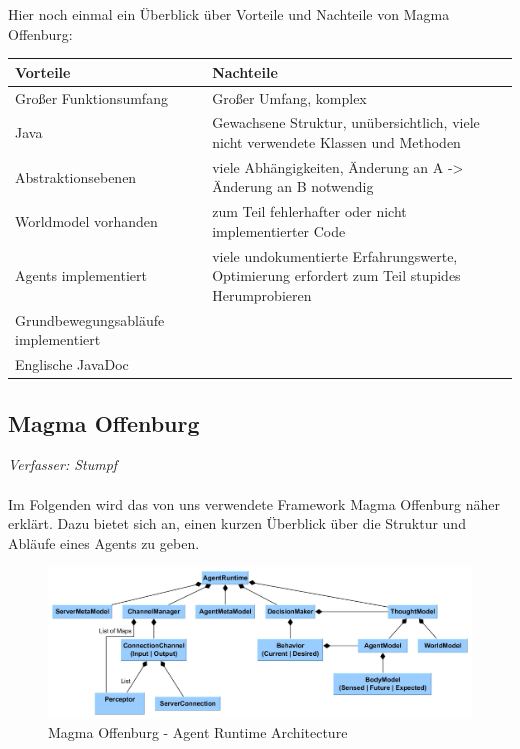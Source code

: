 \documentclass[fontsize=12pt,a4paper,final]{scrartcl}[2003/01/01]
\begin{document}
Hier noch einmal ein Überblick über Vorteile und Nachteile von Magma Offenburg:
\begin{tabularx}{\textwidth}{|X|X|}
\hline
 \textbf{Vorteile}&\textbf{Nachteile}\\
\hline
\hline
 Großer Funktionsumfang&Großer Umfang, komplex\\
\hline 
 Java&Gewachsene Struktur, unübersichtlich, viele nicht verwendete Klassen und Methoden\\
\hline
 Abstraktionsebenen&viele Abhängigkeiten, Änderung an A -> Änderung an B notwendig\\
\hline
 Worldmodel vorhanden&zum Teil fehlerhafter oder nicht implementierter Code\\
\hline
 Agents implementiert&viele undokumentierte Erfahrungswerte,  Optimierung erfordert zum Teil stupides Herumprobieren\\
\hline
 Grundbewegungsabläufe implementiert&\\
\hline
 Englische JavaDoc&\\
\hline
\end{tabularx}

\subsection{Magma Offenburg}
\textit{Verfasser: Stumpf}\\
\\
Im Folgenden wird das von uns verwendete Framework Magma Offenburg näher erklärt. Dazu bietet sich an, einen kurzen Überblick über die Struktur und Abläufe eines Agents zu geben.

\begin{figure}[H]
	\centering
	\includegraphics[width=\textwidth]{Grafiken/Magma/AgentRuntime_Structure}
	\caption{Magma Offenburg - Agent Runtime Architecture}
	\label{fig:Magma - Agent Runtime Struktur}
\end{figure}
\end{document}
